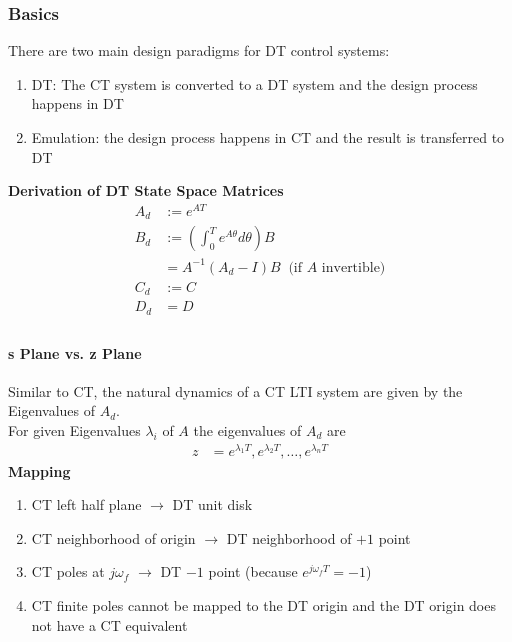 \subsubsection{Basics}
There are two main design paradigms for DT control systems:
\begin{enumerate}
    \item DT: The CT system is converted to a DT system and the design process happens in DT
    \item Emulation: the design process happens in CT and the result is transferred to DT
\end{enumerate}
\textbf{Derivation of DT State Space Matrices}\\
\noindent\begin{align*}
    A_d & :=e^{AT}                                                   \\
    B_d & :=\left(\int_0^T {e^{A\theta}}d\theta\right)B              \\
        & = A^{-1}\left(A_d-I\right)B\;\; \text{(if $A$ invertible)} \\
    C_d & :=C                                                        \\
    D_d & =D                                                         \\
\end{align*}
\paragraph{s Plane vs. z Plane}
Similar to CT, the natural dynamics of a CT LTI system are given by the Eigenvalues of $A_d$.\\
For given Eigenvalues $\lambda_i$ of $A$ the eigenvalues of $A_d$ are
\noindent\begin{align*}
    z & =e^{\lambda_1T},e^{\lambda_2T},\ldots,e^{\lambda_nT}
\end{align*}
\textbf{Mapping}\\
\begin{enumerate}
    \item CT left half plane $\rightarrow$ DT unit disk
    \item CT neighborhood of origin $\rightarrow$ DT neighborhood of $+1$ point
    \item CT poles at $j\omega_f$ $\rightarrow$ DT $-1$ point (because $e^{j\omega_fT}=-1$)
    \item CT finite poles cannot be mapped to the DT origin and the DT origin does not have a CT equivalent
\end{enumerate}
